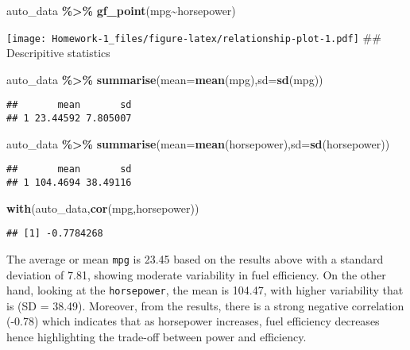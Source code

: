 \documentclass[
]{article}
\newenvironment{Shaded}{\begin{snugshade}}{\end{snugshade}}
\newcommand{\AttributeTok}[1]{\textcolor[rgb]{0.13,0.29,0.53}{#1}}
\newcommand{\FunctionTok}[1]{\textcolor[rgb]{0.13,0.29,0.53}{\textbf{#1}}}
\newcommand{\NormalTok}[1]{#1}
\newcommand{\SpecialCharTok}[1]{\textcolor[rgb]{0.81,0.36,0.00}{\textbf{#1}}}
\begin{document}
\begin{Shaded}
\begin{Highlighting}[]
\NormalTok{auto\_data }\SpecialCharTok{\%\textgreater{}\%} 
  \FunctionTok{gf\_point}\NormalTok{(mpg}\SpecialCharTok{\textasciitilde{}}\NormalTok{horsepower)}
\end{Highlighting}
\end{Shaded}

\texttt{[image: Homework-1\_files/figure-latex/relationship-plot-1.pdf]}
\#\# Descripitive statistics

\begin{Shaded}
\begin{Highlighting}[]
\NormalTok{auto\_data }\SpecialCharTok{\%\textgreater{}\%}
  \FunctionTok{summarise}\NormalTok{(}\AttributeTok{mean=}\FunctionTok{mean}\NormalTok{(mpg),}\AttributeTok{sd=}\FunctionTok{sd}\NormalTok{(mpg))}
\end{Highlighting}
\end{Shaded}

\begin{verbatim}
##       mean       sd
## 1 23.44592 7.805007
\end{verbatim}

\begin{Shaded}
\begin{Highlighting}[]
\NormalTok{auto\_data }\SpecialCharTok{\%\textgreater{}\%}
  \FunctionTok{summarise}\NormalTok{(}\AttributeTok{mean=}\FunctionTok{mean}\NormalTok{(horsepower),}\AttributeTok{sd=}\FunctionTok{sd}\NormalTok{(horsepower))}
\end{Highlighting}
\end{Shaded}

\begin{verbatim}
##       mean       sd
## 1 104.4694 38.49116
\end{verbatim}

\begin{Shaded}
\begin{Highlighting}[]
\FunctionTok{with}\NormalTok{(auto\_data,}\FunctionTok{cor}\NormalTok{(mpg,horsepower))}
\end{Highlighting}
\end{Shaded}

\begin{verbatim}
## [1] -0.7784268
\end{verbatim}

The average or mean \texttt{mpg} is 23.45 based on the results above
with a standard deviation of 7.81, showing moderate variability in fuel
efficiency. On the other hand, looking at the \texttt{horsepower}, the
mean is 104.47, with higher variability that is (SD = 38.49). Moreover,
from the results, there is a strong negative correlation (-0.78) which
indicates that as horsepower increases, fuel efficiency decreases hence
highlighting the trade-off between power and efficiency.
\end{document}
